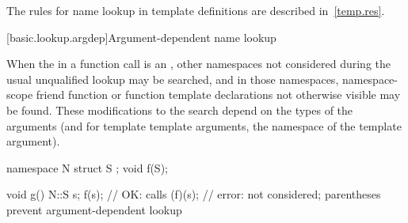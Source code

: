 \pnum
\begin{note}
The rules for name lookup in template definitions are
described in~\ref{temp.res}.
\end{note}

[basic.lookup.argdep]{Argument-dependent name lookup}%

\pnum
When the  in
a function call is an , other namespaces not considered
during the usual unqualified lookup may be
searched, and in those namespaces, namespace-scope friend function or
function template declarations not otherwise
visible may be found.
These modifications to the search depend on the types of the arguments
(and for template template arguments, the namespace of the template
argument).
\begin{example}
\begin{codeblock}
namespace N {
  struct S { };
  void f(S);
}

void g() {
  N::S s;
  f(s);             // OK: calls 
  (f)(s);           // error:  not considered; parentheses prevent argument-dependent lookup
}
\end{codeblock}
\end{example}

